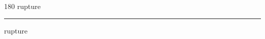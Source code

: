 
\begin{frame}
\begin{center}
\begin{turn}{180}
{\fontsize{2.5cm}{1em}\selectfont rupture}
\end{turn}
\vspace{1em}\par  
\hrule
\vspace{1em}\par  
{\fontsize{2.5cm}{1em}\selectfont rupture}
\end{center}
\end{frame}
